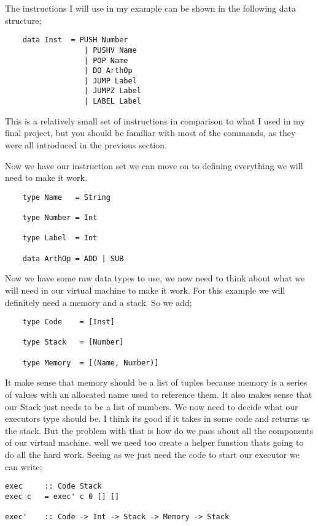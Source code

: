The instructions I will use in my example can be shown in the following data structure;

\begin{lstlisting}
	data Inst  = PUSH Number
	              | PUSHV Name
	              | POP Name
      		      | DO ArthOp
       		      | JUMP Label
      		      | JUMPZ Label
      		      | LABEL Label
\end{lstlisting} 

This is a relatively small set of instructions in comparison to what I used in my final project, but you should be familiar with most of the commands, as they were all introduced in the previous section. 

Now we have our instruction set we can move on to defining everything we will need to make it work.

\begin{lstlisting}
	type Name   = String
	
	type Number = Int
	
	type Label  = Int
	
	data ArthOp = ADD | SUB 
\end{lstlisting} 

Now we have some raw data types to use, we now need to think about what we will need in our virtual machine to make it work. For this example we will definitely need a memory and a stack. So we add;

\begin{lstlisting}
	type Code    = [Inst]
	
	type Stack   = [Number]
	
	type Memory  = [(Name, Number)]		
\end{lstlisting} 

It make sense that memory should be a list of tuples because memory is a series of values with an allocated name used to reference them. It also makes sense that our Stack just needs to be a list of numbers. We now need to decide what our executors type should be. I think its good if it takes in some code and returns us the stack. But the problem with that is how do we pass about all the components of our virtual machine. well we need too create a helper funstion thats going to do all the hard work. Seeing as we just need the code to start our executor we can write;

\begin{lstlisting}
exec     :: Code Stack
exec c   = exec' c 0 [] []

exec'    :: Code -> Int -> Stack -> Memory -> Stack	
\end{lstlisting} 

